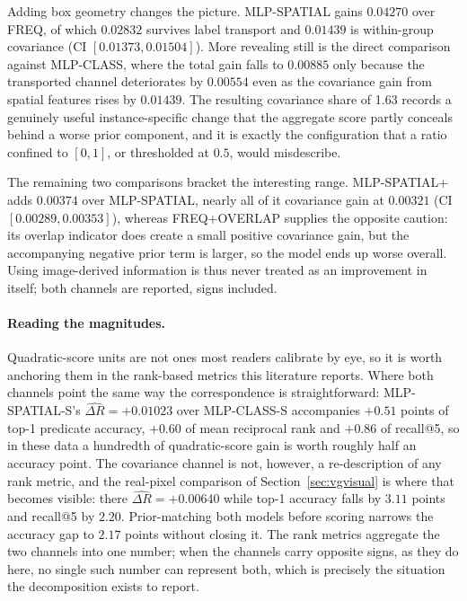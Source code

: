 Adding box geometry changes the picture. MLP-SPATIAL gains $0.04270$ over FREQ, of which
$0.02832$ survives label transport and $0.01439$ is within-group covariance (CI
$[0.01373,0.01504]$). More revealing still is the direct comparison against MLP-CLASS,
where the total gain falls to $0.00885$ only because the transported channel deteriorates by
$0.00554$ even as the covariance gain from spatial features rises by $0.01439$. The resulting covariance share
of 1.63 records a genuinely useful instance-specific change that the aggregate score
partly conceals behind a worse prior component, and it is exactly the configuration that
a ratio confined to $[0,1]$, or thresholded at $0.5$, would misdescribe.

The remaining two comparisons bracket the interesting range. MLP-SPATIAL+ adds $0.00374$
over MLP-SPATIAL, nearly all of it covariance gain at $0.00321$ (CI $[0.00289,0.00353]$),
whereas FREQ+OVERLAP supplies the opposite caution: its overlap indicator does create a
small positive covariance gain, but the accompanying negative prior term is larger, so
the model ends up worse overall. Using image-derived information is thus never treated
as an improvement in itself; both channels are reported, signs included.

\paragraph{Reading the magnitudes.} Quadratic-score units are not ones most readers
calibrate by eye, so it is worth anchoring them in the rank-based metrics this
literature reports. Where both channels point the same way the correspondence is
straightforward: MLP-SPATIAL-S's $\widehat{\Delta R}=+0.01023$ over MLP-CLASS-S
accompanies $+0.51$ points of top-1 predicate accuracy, $+0.60$ of mean reciprocal rank
and $+0.86$ of recall@5, so in these data a hundredth of quadratic-score gain is worth
roughly half an accuracy point. The covariance channel is not, however, a re-description
of any rank metric, and the real-pixel comparison of Section~\ref{sec:vgvisual} is
where that becomes visible: there $\widehat{\Delta R}=+0.00640$ while top-1 accuracy
falls by $3.11$ points and recall@5 by $2.20$. Prior-matching both models before scoring
narrows the accuracy gap to $2.17$ points without closing it. The rank metrics aggregate
the two channels into one number; when the channels carry opposite signs, as they do
here, no single such number can represent both, which is precisely the situation the
decomposition exists to report.


